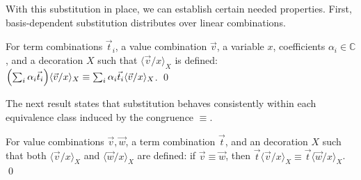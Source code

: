 \documentclass[a4paper,UKenglish,numberwithinsect,pdfa,anonymous]{lipics-v2021}
\theoremstyle{restatestyle}
\newcommand\ket[1]{\ensuremath{|#1\rangle}}
\newcommand\ansubst[2]{\ensuremath{\langle #1 \rangle_{#2}}}
\newcommand\AbsBasis{\ensuremath{\mathsf{H\!O}}}
\def\C{\mathbb{C}}            %
\def\Pair#1#2{(#1,#2)} %
\newcommand\B{\mathbb Z}
\begin{document}
%


With this substitution in place, we can establish certain needed properties.
First, basis-dependent substitution distributes over linear combinations.

\begin{lemma}\label{lem:distributiveSubstitution}
  For term combinations $\vec{t}_{i}$, a value combination $\vec{v}$, a
  variable $x$, coefficients $\alpha_i\in\C$, and a decoration $X$ such that
  $\ansubst{\vec v/x}{X}$ is defined:
  \(
    \Bigl(\sum_i \alpha_i\vec{t}_{i}\Bigr)\ansubst{\vec v/x}{X}
    \equiv
    \sum_i \alpha_i\vec{t}_{i} \ansubst{\vec v/x}{X}
  \).
  \qed
\end{lemma}

The next result states that substitution behaves consistently within each
equivalence class induced by the congruence $\equiv$.

\begin{lemma}\label{lem:EquivSubstitutions}
  For value combinations $\vec{v},\vec{w}$, a term combination $\vec{t}$, and
  an decoration $X$ such that both
  $\ansubst{\vec{v}/x}{X}$ and $\ansubst{\vec{w}/x}{X}$ are defined:
  if $\vec{v}\equiv\vec{w}$, then
  $\vec{t}\ansubst{\vec{v}/x}{X}
  \equiv\vec{t}\ansubst{\vec{w}/x}{X}$.
  \qed
\end{lemma}
\end{document}
